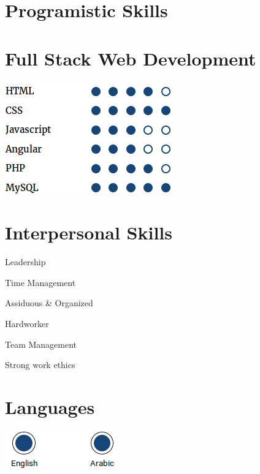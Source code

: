 \documentclass[hidelinks]{article}
\begin{document}
\begin{textblock}{3.3}
\vspace{-4pt}

\section*{Programistic Skills}\vspace{-4pt}

    
 \vspace{-10pt}
 
\section*{Full Stack Web Development}\vspace{-2pt}
\includegraphics[scale=0.65]{Web.png}
\section*{Interpersonal Skills}\vspace{-2pt}

\makebox[0pt][l]\tab{\color{blue}\hspace{0.1em}$\checkmark$}	Leadership 

\makebox[0pt]\tab{\color{blue}\hspace{-1.5em}$\checkmark$}	Time Management 

\makebox[0pt]\tab{\color{blue}\hspace{-1.5em}$\checkmark$}	Assiduous \& Organized

\makebox[0pt]\tab{\color{blue}\hspace{-1.5em}$\checkmark$}	Hardworker
 
\makebox[0pt]\tab{\color{blue}\hspace{-1.5em}$\checkmark$}	Team Management 
 
\makebox[0pt]\tab{\color{blue}\hspace{-1.5em}$\checkmark$}	Strong work ethics

\section*{Languages}
\includegraphics[scale=0.55]{languages2.png}
\end{textblock}
\end{document}
